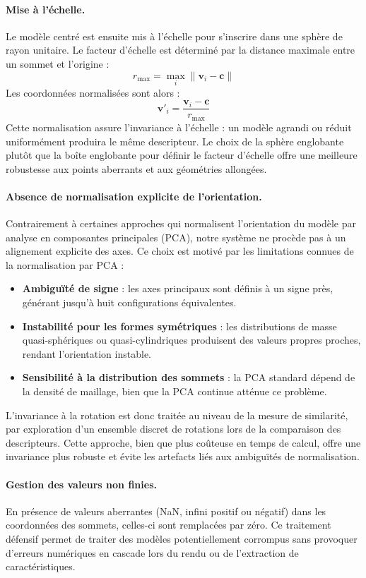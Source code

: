 \documentclass[11pt,a4paper,oneside]{report}
\begin{document}
\paragraph{Mise à l'échelle.} Le modèle centré est ensuite mis à l'échelle pour s'inscrire dans une sphère de rayon unitaire. Le facteur d'échelle est déterminé par la distance maximale entre un sommet et l'origine :
$$r_{\max} = \max_{i} \|\mathbf{v}_i - \mathbf{c}\|$$
Les coordonnées normalisées sont alors :
$$\mathbf{v}'_i = \frac{\mathbf{v}_i - \mathbf{c}}{r_{\max}}$$
Cette normalisation assure l'invariance à l'échelle : un modèle agrandi ou réduit uniformément produira le même descripteur. Le choix de la sphère englobante plutôt que la boîte englobante pour définir le facteur d'échelle offre une meilleure robustesse aux points aberrants et aux géométries allongées.

\paragraph{Absence de normalisation explicite de l'orientation.} Contrairement à certaines approches qui normalisent l'orientation du modèle par analyse en composantes principales (PCA), notre système ne procède pas à un alignement explicite des axes. Ce choix est motivé par les limitations connues de la normalisation par PCA :
\begin{itemize}
    \item \textbf{Ambiguïté de signe} : les axes principaux sont définis à un signe près, générant jusqu'à huit configurations équivalentes.
    \item \textbf{Instabilité pour les formes symétriques} : les distributions de masse quasi-sphériques ou quasi-cylindriques produisent des valeurs propres proches, rendant l'orientation instable.
    \item \textbf{Sensibilité à la distribution des sommets} : la PCA standard dépend de la densité de maillage, bien que la PCA continue atténue ce problème.
\end{itemize}

L'invariance à la rotation est donc traitée au niveau de la mesure de similarité, par exploration d'un ensemble discret de rotations lors de la comparaison des descripteurs. Cette approche, bien que plus coûteuse en temps de calcul, offre une invariance plus robuste et évite les artefacts liés aux ambiguïtés de normalisation.

\paragraph{Gestion des valeurs non finies.} En présence de valeurs aberrantes (NaN, infini positif ou négatif) dans les coordonnées des sommets, celles-ci sont remplacées par zéro. Ce traitement défensif permet de traiter des modèles potentiellement corrompus sans provoquer d'erreurs numériques en cascade lors du rendu ou de l'extraction de caractéristiques.
\end{document}

